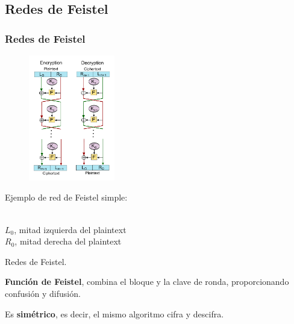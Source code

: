 \documentclass{beamer}
\begin{document}
	\subsection{Redes de Feistel}
	\begin{frame}
	\frametitle{Redes de Feistel}
	\begin{figure}
		\centering
		\includegraphics[height=5.5cm]{./Images/Feistel_cipher.png}\\
	\end{figure}

	Ejemplo de red de Feistel simple:

	\begin{algorithm}[H]
	\begin{algorithmic}[1]
		\REQUIRE \ \\
		\texttt{$L_0$}, mitad izquierda del plaintext\\
		\texttt{$R_0$}, mitad derecha del plaintext\\
		\ENDFOR
		
	\end{algorithmic}
	\caption{Redes de Feistel.}
	\end{algorithm}
	
	\textbf{Función de Feistel}, combina el bloque y la clave de ronda, proporcionando confusión y difusión.

	Es \textbf{simétrico}, es decir, el mismo algoritmo cifra y descifra.
	\end{frame}
\end{document}
